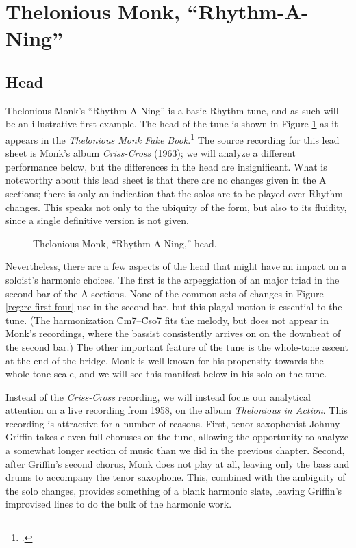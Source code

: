 \section{Thelonious Monk, “Rhythm-A-Ning”}
\label{sec:rhythm-a-ning}

\subsection{Head}

Thelonious Monk's ``Rhythm-A-Ning'' is a basic Rhythm tune, and as such will
be an illustrative first example. The head of the tune is shown in Figure
\ref{ran:head-melody} as it appears in the \emph{Thelonious Monk Fake
  Book}.\footcite[]{sickler:fakebook} The source recording for this lead sheet
is Monk's album \emph{Criss-Cross} (1963); we will analyze a different
performance below, but the differences in the head are
insignificant.\nocite{monk:crisscross} What is noteworthy about this lead
sheet is that there are no changes given in the A sections; there is only an
indication that the solos are to be played over Rhythm changes. This
speaks not only to the ubiquity of the form, but also to its fluidity, since a
single definitive version is not given.

\begin{figure}[tb]
  \caption{Thelonious Monk, ``Rhythm-A-Ning,'' head.}
  \label{ran:head-melody}
\end{figure}

Nevertheless, there are a few aspects of the head that might have an impact on
a soloist's harmonic choices. The first is the arpeggiation of an \Eflat major
triad in the second bar of the A sections. None of the common sets of changes
in Figure \ref{rcg:rc-first-four} use \Eflat in the second bar, but this
plagal motion is essential to the tune. (The harmonization \h{Cm7}--\h{Cso7}
fits the melody, but does not appear in Monk's recordings, where the bassist
consistently arrives on \Eflat on the downbeat of the second bar.) The other
important feature of the tune is the whole-tone ascent at the end of the
bridge. Monk is well-known for his propensity towards the whole-tone scale,
and we will see this manifest below in his solo on the tune.

Instead of the \emph{Criss-Cross} recording, we will instead focus our
analytical attention on a live recording from 1958, on the album \emph{Thelonious in
  Action}.\nocite{monk:action} This recording is attractive for a number of
reasons. First, tenor saxophonist Johnny Griffin takes eleven full choruses on
the tune, allowing the opportunity to analyze a somewhat longer section of
music than we did in the previous chapter. Second, after Griffin's second
chorus, Monk does not play at all, leaving only the bass and drums to
accompany the tenor saxophone. This, combined with the ambiguity of
the solo changes, provides something of a blank harmonic slate, leaving
Griffin's improvised lines to do the bulk of the harmonic work.

